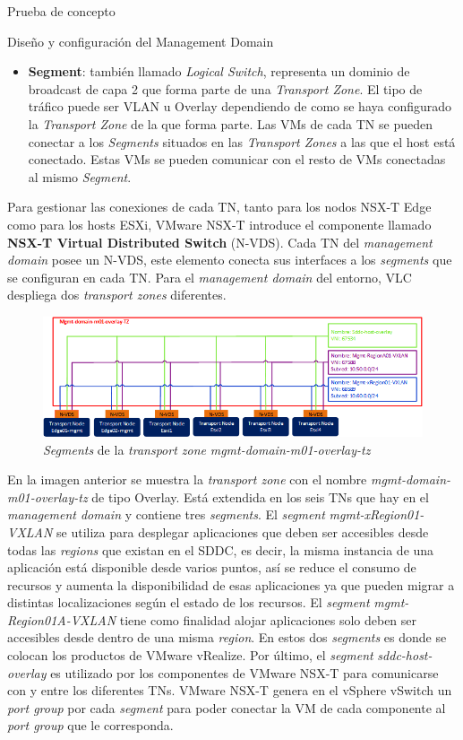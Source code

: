 \begin{section}{Prueba de concepto}
\begin{subsection}{Diseño y configuración del Management Domain}
\begin{itemize}
      \item \textbf{Segment}: también llamado \textit{Logical Switch}, representa un dominio de broadcast de capa 2 que forma parte de una \textit{Transport Zone}. El tipo de tráfico puede ser VLAN u Overlay dependiendo de como se haya configurado la \textit{Transport Zone} de la que forma parte. Las VMs de cada TN se pueden conectar a los \textit{Segments} situados en las \textit{Transport Zones} a las que el host está conectado. Estas VMs se pueden comunicar con el resto de VMs conectadas al mismo \textit{Segment}.
       
    \end{itemize}
    Para gestionar las conexiones de cada TN, tanto para los nodos NSX-T Edge como para los hosts ESXi, VMware NSX-T introduce el componente llamado \textbf{NSX-T Virtual Distributed Switch} (N-VDS). Cada TN del \textit{management domain} posee un N-VDS, este elemento conecta sus interfaces a los \textit{segments} que se configuran en cada TN. Para el \textit{management domain} del entorno, VLC despliega dos \textit{transport zones} diferentes.
    \begin{figure}[h]
      \centering
      \includegraphics[width=1\textwidth]{imaxes/pruebaconcepto/OverlayTZSegments.png}
      \caption{\textit{Segments} de la \textit{transport zone} \textit{mgmt-domain-m01-overlay-tz}}
      \label{fig:overlay-TZ-segments-NSXT}
    \end{figure}
    \FloatBarrier
    En la imagen anterior se muestra la \textit{transport zone} con el nombre \textit{mgmt-domain-m01-overlay-tz} de tipo Overlay. Está extendida en los seis TNs que hay en el \textit{management domain} y contiene tres \textit{segments}. El \textit{segment} \textit{mgmt-xRegion01-VXLAN} se utiliza para desplegar aplicaciones que deben ser accesibles desde todas las \textit{regions} que existan en el SDDC, es decir, la misma instancia de una aplicación está disponible desde varios puntos, así se reduce el consumo de recursos y aumenta la disponibilidad de esas aplicaciones ya que pueden migrar a distintas localizaciones según el estado de los recursos. El \textit{segment} \textit{mgmt-Region01A-VXLAN} tiene como finalidad alojar aplicaciones solo deben ser accesibles desde dentro de una misma \textit{region}. En estos dos \textit{segments} es donde se colocan los productos de VMware vRealize. Por último, el \textit{segment} \textit{sddc-host-overlay} es utilizado por los componentes de VMware NSX-T para comunicarse con y entre los diferentes TNs. VMware NSX-T genera en el vSphere vSwitch un \textit{port group} por cada \textit{segment} para poder conectar la VM de cada componente al \textit{port group} que le corresponda.


\end{subsection}
\end{section}
